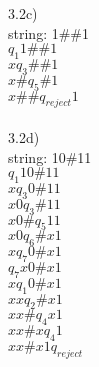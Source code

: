 \documentclass[11pt]{article}
\begin{document}
\noindent3.2c)\\
string: 1\#\#1\\
$q_1 1 \# \# 1$\\
$x q_3 \# \# 1$\\
$x \# q_5 \# 1$\\
$x \# \# q_{reject} 1$\\ \\

\noindent3.2d)\\
string: 10\#11\\
$q_1 1 0 \# 1 1$\\
$x q_3 0 \# 1 1$\\
$x 0 q_3 \# 1 1$\\
$x 0 \# q_5 1 1$\\
$x 0 q_6 \# x 1$\\
$x q_7 0 \# x 1$\\
$q_7 x 0 \# x 1$\\
$x q_1 0 \# x 1$\\
$x x q_2 \# x 1$\\
$x x \# q_4 x 1$\\
$x x \# x q_4 1$\\
$x x \# x 1 q_{reject}$\\ \\

\end{document}
